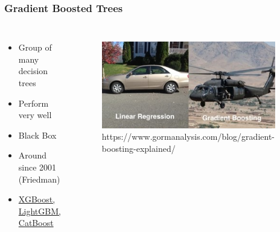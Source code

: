 \documentclass[
    utf8,
    aspectratio=169
]{beamer}  %
\begin{document}
\begin{frame}
	\frametitle{Gradient Boosted Trees}
	\begin{columns}[onlytextwidth]
		\begin{itemize}
			\item Group of many decision trees
			\item Perform very well
			\item Black Box
			\item Around since 2001 (Friedman)
			\item \href{https://github.com/mayer79/gradient_boosting_comparison}{XGBoost, LightGBM, CatBoost}
		\end{itemize}
		
		\begin{figure}
			\includegraphics[width=0.95\textwidth]{pics/helicopter.jpg}
			\tiny{https://www.gormanalysis.com/blog/gradient-boosting-explained/}
		\end{figure}
	\end{columns}
\end{frame}
\end{document}
